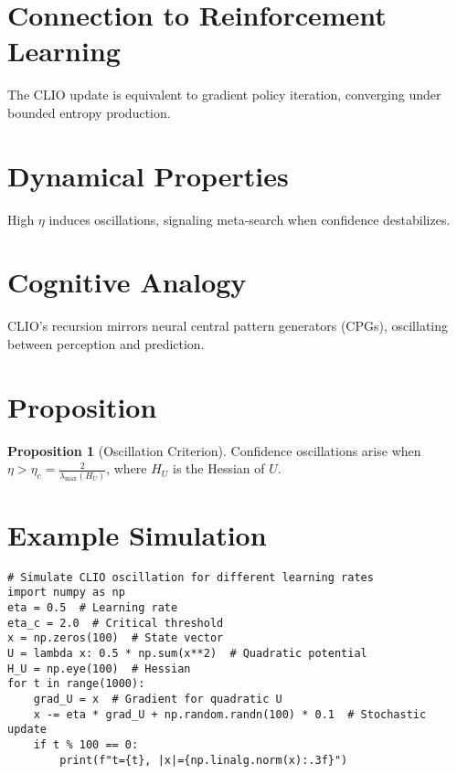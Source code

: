 \documentclass[12pt]{book}
\theoremstyle{definition}
\newtheorem{proposition}{Proposition}[chapter]
\begin{document}
\section{Connection to Reinforcement Learning}
The CLIO update is equivalent to gradient policy iteration, converging under bounded entropy production.

\section{Dynamical Properties}
High \(\eta\) induces oscillations, signaling meta-search when confidence destabilizes.

\section{Cognitive Analogy}
CLIO’s recursion mirrors neural central pattern generators (CPGs), oscillating between perception and prediction.

\section{Proposition}
\begin{proposition}[Oscillation Criterion]
\label{prop:oscillation}
Confidence oscillations arise when \(\eta > \eta_c = \frac{2}{\lambda_{\max}(H_U)}\), where \(H_U\) is the Hessian of \(U\).
\end{proposition}

\section{Example Simulation}
\begin{minipage}{\textwidth}
\vspace*{\fill}
\begin{lstlisting}[caption={CLIO Oscillation Simulation}, label={lst:clio_code}]
# Simulate CLIO oscillation for different learning rates
import numpy as np
eta = 0.5  # Learning rate
eta_c = 2.0  # Critical threshold
x = np.zeros(100)  # State vector
U = lambda x: 0.5 * np.sum(x**2)  # Quadratic potential
H_U = np.eye(100)  # Hessian
for t in range(1000):
    grad_U = x  # Gradient for quadratic U
    x -= eta * grad_U + np.random.randn(100) * 0.1  # Stochastic update
    if t % 100 == 0:
        print(f"t={t}, |x|={np.linalg.norm(x):.3f}")
\end{lstlisting}
\vspace*{\fill}
\end{minipage}
\end{document}

